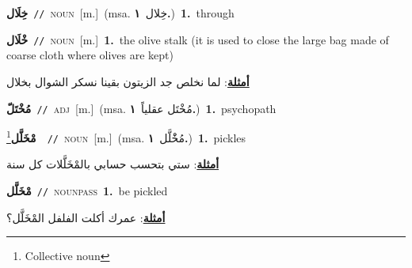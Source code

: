 \documentclass[10pt,a4paper,twoside]{article} %
\begin{document}
\begin{multicols}{2}
{\setlength\topsep{0pt}\textbf{\foreignlanguage{arabic}{خِلَال}}\ {\color{gray}\texttt{//}\color{black}}\ \textsc{noun}\ [m.]\ \color{gray}(msa. \foreignlanguage{arabic}{خِلال}~\foreignlanguage{arabic}{\textbf{١.}})\color{black}\ \textbf{1.}~through\ } \vspace{2mm}

{\setlength\topsep{0pt}\textbf{\foreignlanguage{arabic}{خْلَال}}\ {\color{gray}\texttt{//}\color{black}}\ \textsc{noun}\ [m.]\ \textbf{1.}~the olive stalk (it is used to close the large bag made of coarse cloth where olives are kept)\  \begin{flushright}\color{gray}\foreignlanguage{arabic}{\textbf{\underline{\foreignlanguage{arabic}{أمثلة}}}: لما نخلص جد الزيتون بقينا نسكر الشوال بخلال}\end{flushright}\color{black}} \vspace{2mm}

{\setlength\topsep{0pt}\textbf{\foreignlanguage{arabic}{مُخْتَلّ}}\ {\color{gray}\texttt{//}\color{black}}\ \textsc{adj}\ [m.]\ \color{gray}(msa. \foreignlanguage{arabic}{مُخْتَل عقلياً}~\foreignlanguage{arabic}{\textbf{١.}})\color{black}\ \textbf{1.}~psychopath\ } \vspace{2mm}

{\setlength\topsep{0pt}\textbf{\foreignlanguage{arabic}{مْخَلَّل}}\footnote{Collective noun}\ \ {\color{gray}\texttt{//}\color{black}}\ \textsc{noun}\ [m.]\ \color{gray}(msa. \foreignlanguage{arabic}{مُخَْلَّل}~\foreignlanguage{arabic}{\textbf{١.}})\color{black}\ \textbf{1.}~pickles\  \begin{flushright}\color{gray}\foreignlanguage{arabic}{\textbf{\underline{\foreignlanguage{arabic}{أمثلة}}}: ستي بتحسب حسابي بالمْخَلَّلات كل سنة}\end{flushright}\color{black}} \vspace{2mm}

{\setlength\topsep{0pt}\textbf{\foreignlanguage{arabic}{مْخَلَّل}}\ {\color{gray}\texttt{//}\color{black}}\ \textsc{noun\textunderscore pass}\ \textbf{1.}~be pickled\  \begin{flushright}\color{gray}\foreignlanguage{arabic}{\textbf{\underline{\foreignlanguage{arabic}{أمثلة}}}: عمرك أكلت الفلفل المْخَلَّل؟}\end{flushright}\color{black}} \vspace{2mm}


\end{multicols}
\end{document}
